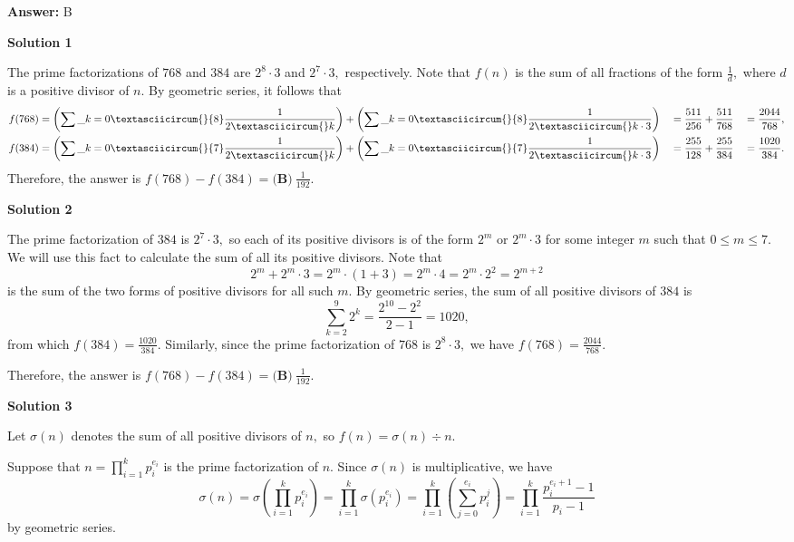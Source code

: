 \begin{enumerate}
 \textbf{Answer: }B



\textbf{Solution 1}

The prime factorizations of $768$ and $384$ are $2^8\cdot3$ and $2^7\cdot3,$ respectively. Note that $f(n)$ is the sum of all fractions of the form $\frac 1d,$ where $d$ is a positive divisor of $n.$ By geometric series, it follows that
 \begin{alignat*}{8} f(768)&=\left(\sum\_{k=0}\textasciicircum{}{8}\frac{1}{2\textasciicircum{}k}\right)+\left(\sum\_{k=0}\textasciicircum{}{8}\frac{1}{2\textasciicircum{}k\cdot3}\right)&&=\frac{511}{256}+\frac{511}{768}&&=\frac{2044}{768}, \\ f(384)&=\left(\sum\_{k=0}\textasciicircum{}{7}\frac{1}{2\textasciicircum{}k}\right)+\left(\sum\_{k=0}\textasciicircum{}{7}\frac{1}{2\textasciicircum{}k\cdot3}\right)&&=\frac{255}{128}+\frac{255}{384}&&=\frac{1020}{384}. \end{alignat*}Therefore, the answer is $f(768)-f(384)=\boxed{\textbf{(B)}\ \frac{1}{192}}.$




\textbf{Solution 2}

The prime factorization of $384$ is $2^7\cdot3,$ so each of its positive divisors is of the form $2^m$ or $2^m\cdot3$ for some integer $m$ such that $0\leq m\leq7.$ We will use this fact to calculate the sum of all its positive divisors. Note that 
 \[2^m + 2^m\cdot3 = 2^m\cdot(1+3) = 2^m\cdot4 = 2^m\cdot2^2 = 2^{m+2}\] is the sum of the two forms of positive divisors for all such $m.$ By geometric series, the sum of all positive divisors of $384$ is 
 \[\sum_{k=2}^{9}2^k = \frac{2^{10}-2^2}{2-1} = 1020,\] from which $f(384) = \frac{1020}{384}.$ Similarly, since the prime factorization of $768$ is $2^8 \cdot 3,$ we have $f(768) = \frac{2044}{768}.$ 

 Therefore, the answer is $f(768)-f(384)=\boxed{\textbf{(B)}\ \frac{1}{192}}.$




\textbf{Solution 3}

Let $\sigma(n)$ denotes the sum of all positive divisors of $n,$ so $f(n)=\sigma(n)\div n.$

 Suppose that $n=\prod_{i=1}^{k}p_i^{e_i}$ is the prime factorization of $n.$ Since $\sigma(n)$ is multiplicative, we have 
 \[\sigma(n)=\sigma\left(\prod_{i=1}^{k}p_i^{e_i}\right)=\prod_{i=1}^{k}\sigma\left(p_i^{e_i}\right)=\prod_{i=1}^{k}\left(\sum_{j=0}^{e_i}p_i^j\right)=\prod_{i=1}^{k}\frac{p_i^{e_i+1}-1}{p_i-1}\] by geometric series.


\end{enumerate}
